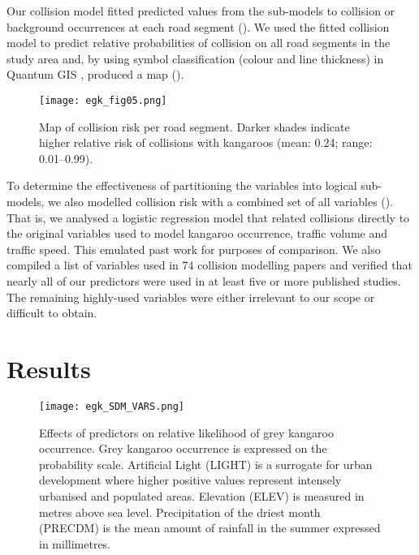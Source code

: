 Our collision model fitted predicted values from the sub-models to collision or background occurrences at each road segment (). We used the fitted collision model to predict relative probabilities of collision on all road segments in the study area and, by using symbol classification (colour and line thickness) in Quantum GIS \citep{qgis09}, produced a map ().

\begin{figure*}[htp]
  \centering
  \texttt{[image: egk\_fig05.png]}
  \caption[Map of collision risk per road segment in Victoria]{Map of collision risk per road segment. Darker shades indicate higher relative risk of collisions with kangaroos (mean: 0.24; range: 0.01--0.99).}
  \label{egk_collmap}
\end{figure*}

To determine the effectiveness of partitioning the variables into logical sub-models, we also modelled collision risk with a combined set of all variables (). That is, we analysed a logistic regression model that related collisions directly to the original variables used to model kangaroo occurrence, traffic volume and traffic speed. This emulated past work for purposes of comparison. We also compiled a list of variables used in 74 collision modelling papers and verified that nearly all of our predictors were used in at least five or more published studies. The remaining highly-used variables were either irrelevant to our scope or difficult to obtain.

\section{Results}

\begin{figure*}[htp]
  \centering
  \texttt{[image: egk\_SDM\_VARS.png]}
  \caption[Effects of predictors on relative likelihood of grey kangaroo occurrence]{Effects of predictors on relative likelihood of grey kangaroo occurrence. Grey kangaroo occurrence  is expressed on the probability scale. Artificial Light (LIGHT) is a surrogate for urban development where higher positive values represent intensely urbanised and populated areas. Elevation (ELEV) is measured in metres above sea level. Precipitation of the driest month (PRECDM) is the mean amount of rainfall in the summer expressed in millimetres.}
  \label{egk_sdm_vars}
\end{figure*}

